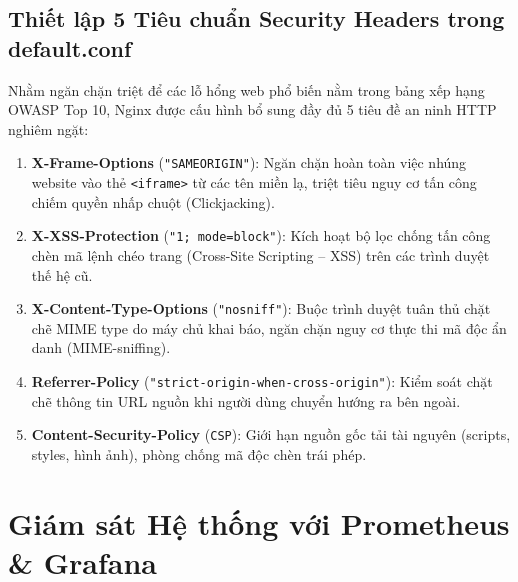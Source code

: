 \documentclass[12pt,a4paper,oneside]{report}
\begin{document}
\section{Thiết lập 5 Tiêu chuẩn Security Headers trong default.conf}
Nhằm ngăn chặn triệt để các lỗ hổng web phổ biến nằm trong bảng xếp hạng OWASP Top 10, Nginx được cấu hình bổ sung đầy đủ 5 tiêu đề an ninh HTTP nghiêm ngặt:
\begin{enumerate}
    \item \textbf{X-Frame-Options} (\texttt{"SAMEORIGIN"}): Ngăn chặn hoàn toàn việc nhúng website vào thẻ \texttt{<iframe>} từ các tên miền lạ, triệt tiêu nguy cơ tấn công chiếm quyền nhấp chuột (Clickjacking).
    \item \textbf{X-XSS-Protection} (\texttt{"1; mode=block"}): Kích hoạt bộ lọc chống tấn công chèn mã lệnh chéo trang (Cross-Site Scripting -- XSS) trên các trình duyệt thế hệ cũ.
    \item \textbf{X-Content-Type-Options} (\texttt{"nosniff"}): Buộc trình duyệt tuân thủ chặt chẽ MIME type do máy chủ khai báo, ngăn chặn nguy cơ thực thi mã độc ẩn danh (MIME-sniffing).
    \item \textbf{Referrer-Policy} (\texttt{"strict-origin-when-cross-origin"}): Kiểm soát chặt chẽ thông tin URL nguồn khi người dùng chuyển hướng ra bên ngoài.
    \item \textbf{Content-Security-Policy} (\texttt{CSP}): Giới hạn nguồn gốc tải tài nguyên (scripts, styles, hình ảnh), phòng chống mã độc chèn trái phép.
\end{enumerate}

\chapter{Giám sát Hệ thống với Prometheus \& Grafana}
\end{document}
